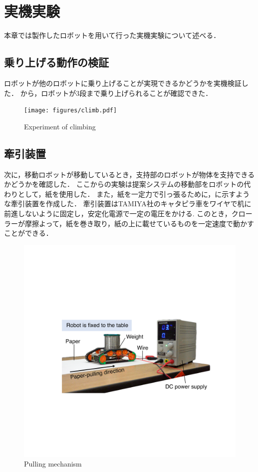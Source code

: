 \section{実機実験}
本章では製作したロボットを用いて行った実機実験について述べる．

\subsection{乗り上げる動作の検証}
ロボットが他のロボットに乗り上げることが実現できるかどうかを実機検証した．
から，ロボットが3段まで乗り上げられることが確認できた．
\begin{figure}[tb]
  \centering
  \texttt{[image: figures/climb.pdf]}
  \caption{Experiment of climbing}
  \label{fig:climb}
\end{figure}

\subsection*{牽引装置}
次に，移動ロボットが移動しているとき，支持部のロボットが物体を支持できるかどうかを確認した．
ここからの実験は提案システムの移動部をロボットの代わりとして，紙を使用した．
また，紙を一定力で引っ張るために，に示すような牽引装置を作成した．
牽引装置はTAMIYA社のキャタピラ車をワイヤで机に前進しないように固定し，安定化電源で一定の電圧をかける. このとき，クローラーが摩擦よって，紙を巻き取り，紙の上に載せているものを一定速度で動かすことができる．
\begin{figure}[tb]
  \centering
  \includegraphics[width=0.85\columnwidth]{figures/pulling-mechanism.pdf}
  \caption{Pulling mechanism}
  \label{fig:pulling-mechanism}
\end{figure}
